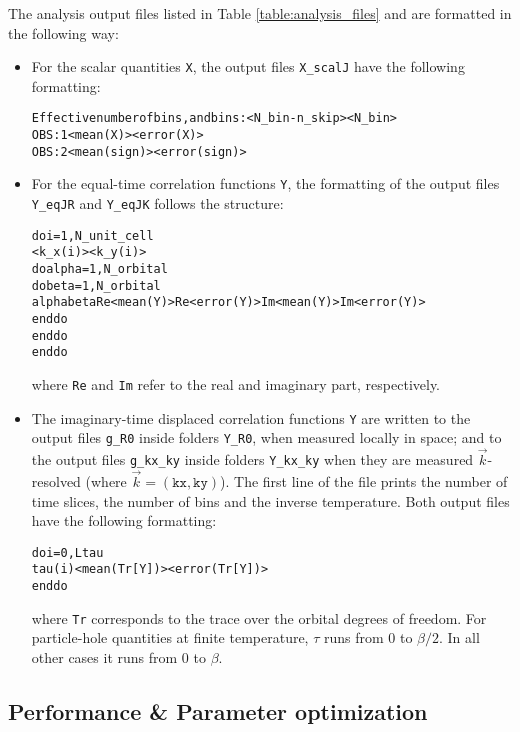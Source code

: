 %
The analysis output files listed in Table \ref{table:analysis_files} and are formatted in the following way:
\begin{itemize}
	\item For the scalar quantities \texttt{X}, the output files  \texttt{X\_scalJ} have the following formatting:
	\begin{alltt}
		Effective number of bins, and bins:           <N_bin - n_skip>          <N_bin>	
		OBS :    1      <mean(X)>      <error(X)>	
		OBS :    2      <mean(sign)>   <error(sign)>
	\end{alltt}
	
	\item For the equal-time correlation functions \texttt{Y}, the formatting of the output files \texttt{Y\_eqJR} and \texttt{Y\_eqJK} follows the structure:
	\begin{alltt}
		do i = 1, N_unit_cell
		   <k_x(i)>   <k_y(i)>
		   do alpha = 1, N_orbital
		      do beta  = 1, N_orbital
		         alpha   beta   Re<mean(Y)>   Re<error(Y)>   Im<mean(Y)>   Im<error(Y)>
		      enddo
		   enddo
		enddo
	\end{alltt}
	where \texttt{Re} and \texttt{Im} refer to the real and imaginary part, respectively.
	
	\item The imaginary-time displaced correlation functions \texttt{Y} are written to the output files \texttt{g\_R0} inside folders \texttt{Y\_R0}, when measured locally in space; 
	and to the output files \texttt{g\_kx\_ky} inside folders \texttt{Y\_kx\_ky} when they are measured $\vec{k}$-resolved (where $\vec{k}=(\texttt{kx}, \texttt{ky})$). The first line of the file prints the number of time slices, 
	the number of bins and the inverse temperature. 
	Both output files have the following formatting:
	\begin{alltt}
		do i = 0, Ltau
		   tau(i)   <mean( Tr[Y] )>   <error( Tr[Y])>
		enddo
	\end{alltt}
	where \texttt{Tr} corresponds to the trace over the orbital degrees of freedom.   For particle-hole quantities at finite temperature,  $\tau$ runs from 
	$0$ to $\beta/2$.   In all other cases it runs from $0$ to $\beta$. 
	
	
\end{itemize}



%
\subsection{Performance \& Parameter optimization} \label{sec:optimize}
%


